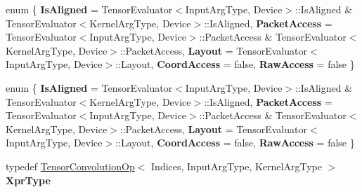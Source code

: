 \begin{DoxyCompactItemize}
\item 
\mbox{\label{struct_eigen_1_1_tensor_evaluator_3_01const_01_tensor_convolution_op_3_01_indices_00_01_input_ar27ed28dccb4630db304c3ad822c3d857_ac0c35eefbdb8554807b5415bff0350c6}} 
enum \{ \newline
{\bfseries Is\+Aligned} = Tensor\+Evaluator$<$Input\+Arg\+Type, Device$>$\+:\+:Is\+Aligned \& Tensor\+Evaluator$<$Kernel\+Arg\+Type, Device$>$\+:\+:Is\+Aligned, 
{\bfseries Packet\+Access} = Tensor\+Evaluator$<$Input\+Arg\+Type, Device$>$\+:\+:Packet\+Access \& Tensor\+Evaluator$<$Kernel\+Arg\+Type, Device$>$\+:\+:Packet\+Access, 
{\bfseries Layout} = Tensor\+Evaluator$<$Input\+Arg\+Type, Device$>$\+:\+:Layout, 
{\bfseries Coord\+Access} = false, 
\newline
{\bfseries Raw\+Access} = false
 \}
\item 
\mbox{\label{struct_eigen_1_1_tensor_evaluator_3_01const_01_tensor_convolution_op_3_01_indices_00_01_input_ar27ed28dccb4630db304c3ad822c3d857_afdacdcac791a9a69d849af68eb781cb2}} 
enum \{ \newline
{\bfseries Is\+Aligned} = Tensor\+Evaluator$<$Input\+Arg\+Type, Device$>$\+:\+:Is\+Aligned \& Tensor\+Evaluator$<$Kernel\+Arg\+Type, Device$>$\+:\+:Is\+Aligned, 
{\bfseries Packet\+Access} = Tensor\+Evaluator$<$Input\+Arg\+Type, Device$>$\+:\+:Packet\+Access \& Tensor\+Evaluator$<$Kernel\+Arg\+Type, Device$>$\+:\+:Packet\+Access, 
{\bfseries Layout} = Tensor\+Evaluator$<$Input\+Arg\+Type, Device$>$\+:\+:Layout, 
{\bfseries Coord\+Access} = false, 
\newline
{\bfseries Raw\+Access} = false
 \}
\item 
\mbox{\label{struct_eigen_1_1_tensor_evaluator_3_01const_01_tensor_convolution_op_3_01_indices_00_01_input_ar27ed28dccb4630db304c3ad822c3d857_acd8c51aceadc03586e487351da8e1c7a}} 
typedef \hyperlink{class_eigen_1_1_tensor_convolution_op}{Tensor\+Convolution\+Op}$<$ Indices, Input\+Arg\+Type, Kernel\+Arg\+Type $>$ {\bfseries Xpr\+Type}

\end{DoxyCompactItemize}
